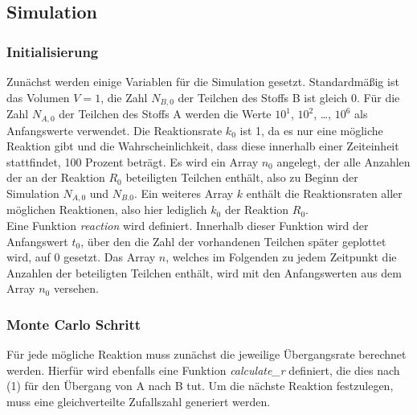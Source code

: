 \documentclass{scrartcl}
\begin{document}
\subsection{Simulation} 
\subsubsection{Initialisierung}
Zunächst werden einige Variablen für die Simulation gesetzt. Standardmäßig ist das Volumen $V = 1$, die Zahl $N_{B, 0}$ der Teilchen des Stoffs B ist gleich 0. Für die Zahl $N_{A, 0}$ der Teilchen des Stoffs A werden die Werte $10^1$, $10^2$, \dots, $10^6$ als Anfangswerte verwendet. Die Reaktionsrate $k_0$ ist 1, da es nur eine mögliche Reaktion gibt und die Wahrscheinlichkeit, dass diese innerhalb einer Zeiteinheit stattfindet, 100 Prozent beträgt. Es wird ein Array $n_0$ angelegt, der alle Anzahlen der an der Reaktion $R_0$ beteiligten Teilchen enthält, also zu Beginn der Simulation $N_{A, 0}$ und $N_{B. 0}$. Ein weiteres Array $k$ enthält die Reaktionsraten aller möglichen Reaktionen, also hier lediglich $k_0$ der Reaktion $R_0$. \\
Eine Funktion \textit{reaction} wird definiert. Innerhalb dieser Funktion wird der Anfangswert $t_0$, über den die Zahl der vorhandenen Teilchen später geplottet wird, auf 0 gesetzt. Das Array $n$, welches im Folgenden zu jedem Zeitpunkt die Anzahlen der beteiligten Teilchen enthält, wird mit den Anfangswerten aus dem Array $n_0$ versehen.

\subsubsection{Monte Carlo Schritt}
Für jede mögliche Reaktion muss zunächst die jeweilige Übergangsrate berechnet werden. Hierfür wird ebenfalls eine Funktion \textit{calculate\_r} definiert, die dies nach (1) für den Übergang von A nach B tut. Um die nächste Reaktion festzulegen, muss eine gleichverteilte Zufallszahl generiert werden.  %
\end{document}
